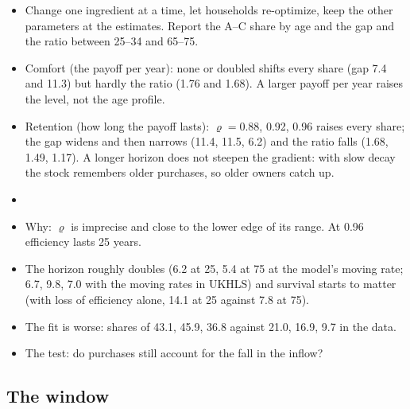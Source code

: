 \begin{itemize}
  \item Change one ingredient at a time, let households re-optimize, keep
    the other parameters at the estimates. Report the A--C share by age and
    the gap and the ratio between 25--34 and 65--75.
  \item Comfort (the payoff per year): none or doubled shifts every share
    (gap 7.4 and 11.3) but hardly the ratio (1.76 and 1.68). A larger
    payoff per year raises the level, not the age profile.
  \item Retention (how long the payoff lasts): $\varrho=0.88$, 0.92, 0.96
    raises every share; the gap widens and then narrows (11.4, 11.5, 6.2)
    and the ratio falls (1.68, 1.49, 1.17). A longer horizon does not
    steepen the gradient: with slow decay the stock remembers older
    purchases, so older owners catch up.
  \item {}
\end{itemize}

\begin{itemize}
  \item Why: $\varrho$ is imprecise and close to the lower edge of its
    range. At 0.96 efficiency lasts 25 years.
  \item The horizon roughly doubles (6.2 at 25, 5.4 at 75 at the model's
    moving rate; 6.7, 9.8, 7.0 with the moving rates in UKHLS) and survival
    starts to matter (with loss of efficiency alone, 14.1 at 25 against 7.8
    at 75).
  \item The fit is worse: shares of 43.1, 45.9, 36.8 against 21.0, 16.9,
    9.7 in the data.
  \item The test: do purchases still account for the fall in the inflow?
\end{itemize}

\subsection{The window}

